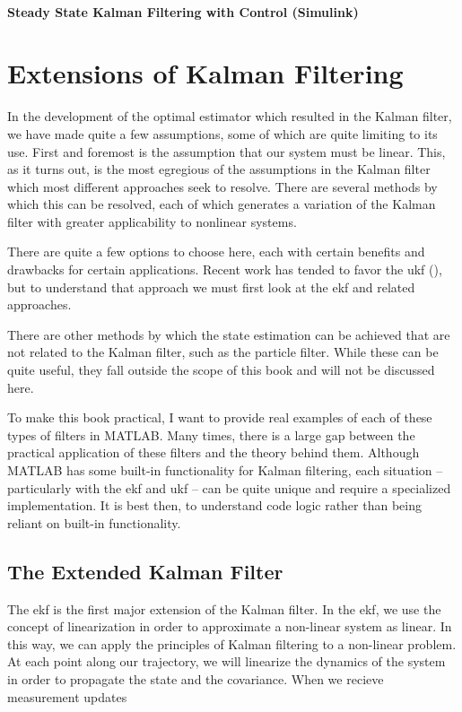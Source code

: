\subsubsection{Steady State Kalman Filtering with Control (Simulink)}


\newpage
\printendnotes


\chapter{Extensions of Kalman Filtering}\label{chap:kalman filter extensions}
In the development of the optimal estimator which resulted in the Kalman filter, we have made quite a few assumptions, some of which are quite limiting to its use. First and foremost is the assumption that our system must be linear. This, as it turns out, is the most egregious of the assumptions in the Kalman filter which most different approaches seek to resolve. There are several methods by which this can be resolved, each of which generates a variation of the Kalman filter with greater applicability to nonlinear systems. 

There are quite a few options to choose here, each with certain benefits and drawbacks for certain applications. Recent work has tended to favor the \gls{ukf} (\cite{wan_unscented_2000, chadha_unscented_2019}), but to understand that approach we must first look at the \gls{ekf} and related approaches.

There are other methods by which the state estimation can be achieved that are not related to the Kalman filter, such as the particle filter. While these can be quite useful, they fall outside the scope of this book and will not be discussed here.

To make this book practical, I want to provide real examples of each of these types of filters in MATLAB. Many times, there is a large gap between the practical application of these filters and the theory behind them. Although MATLAB has some built-in functionality for Kalman filtering, each situation -- particularly with the \gls{ekf} and \gls{ukf} -- can be quite unique and require a specialized implementation. It is best then, to understand code logic rather than being reliant on built-in functionality.

\section{The Extended Kalman Filter}

The \gls{ekf} is the first major extension of the Kalman filter.  In the \gls{ekf}, we use the concept of linearization in order to approximate a non-linear system as linear. In this way, we can apply the principles of Kalman filtering to a non-linear problem. At each point along our trajectory, we will linearize the dynamics of the system in order to propagate the state and the covariance. When we recieve measurement updates


